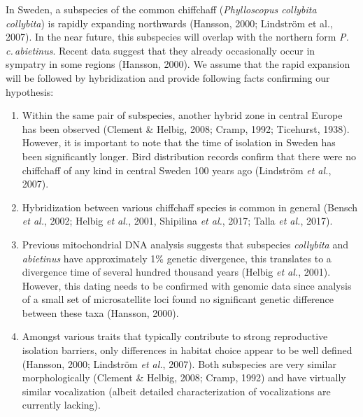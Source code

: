 \documentclass[11pt,a4paper]{article}
\begin{document}
In Sweden, a subspecies of the common chiffchaff (\textit{Phylloscopus collybita collybita}) is rapidly expanding northwards (Hansson, 2000; Lindström et al., 2007). In the near future, this subspecies will overlap with the northern form \textit{P.\,c.\,abietinus}. Recent data suggest that they already occasionally occur in sympatry in some regions (Hansson, 2000). We assume that the rapid expansion will be followed by hybridization and provide following facts confirming our hypothesis:
\begin{enumerate}
\item	Within the same pair of subspecies, another hybrid zone in central Europe has been observed (Clement \& Helbig, 2008; Cramp, 1992; Ticehurst, 1938). However, it is important to note that the time of isolation in Sweden has been significantly longer. Bird distribution records confirm that there were no chiffchaff of any kind in central Sweden 100 years ago (Lindström \textit{et al.}, 2007). 
\item	Hybridization between various chiffchaff species is common in general (Bensch \textit{et al.}, 2002; Helbig \textit{et al.}, 2001, Shipilina \textit{et al.}, 2017; Talla \textit{et al.}, 2017). 
\item	Previous mitochondrial DNA analysis suggests that subspecies \textit{collybita} and \textit{abietinus} have approximately 1\% genetic divergence, this translates to a divergence time of several hundred thousand years (Helbig \textit{et al.}, 2001). However, this dating needs to be confirmed with genomic data since analysis of a small set of microsatellite loci found no significant genetic difference between these taxa (Hansson, 2000). 
\item	Amongst various traits that typically contribute to strong reproductive isolation barriers, only differences in habitat choice appear to be well defined (Hansson, 2000; Lindström \textit{et al.}, 2007). Both subspecies are very similar morphologically (Clement \& Helbig, 2008; Cramp, 1992) and have virtually similar vocalization (albeit detailed characterization of vocalizations are currently lacking).
\end{enumerate}
\end{document}
